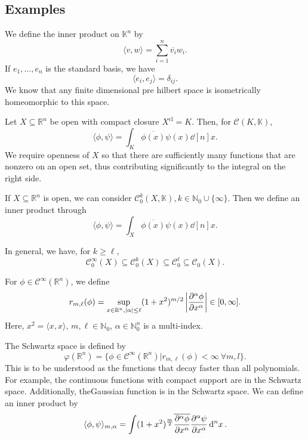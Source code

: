 \documentclass[prb,12pt]{revtex4-2}
\theoremstyle{definition}
\theoremstyle{definition}
\theoremstyle{definition}
\newcommand{\N}{\mathbb{N}}
\newcommand{\R}{\mathbb{R}}
\begin{document}
\subsection{Examples}
\begin{Example}
	We define the inner product on $\mathbb{K}^n$ by
	\[
		\langle v, w\rangle = \sum_{i=1}^n \overline{v_i}w_i
	.\] 
	If  $e_1, \dots, e_n$ is the standard basis, we have
	\[
		\langle e_i, e_j\rangle = \delta_{ij}
	.\]
	We know that any finite dimensional pre hilbert space is isometrically homeomorphic to this space.
\end{Example}
\begin{Example}
	Let $X\subseteq \R^n$ be open with compact closure $X^\text{cl}=K$. Then, for $\mathcal{C}(K, \mathbb{K})$, 
	\[
		\langle \phi, \psi\rangle = \int_K \overline{\phi(x)}\psi(x)\dd[n]{x}
	.\] 
	We require openness of $X$ so that there are sufficiently many functions that are nonzero on an open set, thus contributing significantly to the integral on the right side. 
\end{Example}
\begin{Example}
	If $X\subseteq \R^n$ is open, we can consider $\mathcal{C}_0^k(X, \mathbb{K}),k \in \N_0\cup \{\infty\} $. Then we define an inner product through
	\[
		\langle \phi, \psi\rangle = \int_X \overline{\phi(x)}\psi(x)\dd[n]{x}
	.\] 
\end{Example}
In general, we have, for $k\ge \ell$,
\[
	\mathcal{C}_0^\infty (X) \subseteq \mathcal{C}_0^k(X)\subseteq \mathcal{C}_0^{\ell}\subseteq \mathcal{C}_0(X)
.\] 
\begin{Example}
	For $\phi\in \mathcal{C}^\infty(\R^n)$, we define
	\[
		r_{m, \ell}(\phi) = \sup_{x\in \R^n,|\alpha|\le \ell}(1+x^2)^{m / 2} \left| \pdv[\alpha]{\phi}{x}(x) \right| \in [0,\infty]
	.\] 
	Here, $x^2 = \langle x,x \rangle$, $m, \ell \in \N_0$, $\alpha\in \N_0^n$ is a multi-index.

	The Schwartz space is defined by
	\[
		\varphi(\R^n) = \{\phi\in \mathcal{C}^\infty(\R^n)|r_{m,\ell}(\phi)<\infty~\forall m, l\} 
	.\] 
	This is to be understood as the functions that decay faster than all polynomials. For example, the continuous functions with compact support are in the Schwartz space. Additionally, theGaussian function is in the Schwartz space. We can define an inner product by
	\[
		\langle \phi, \psi\rangle_{m, \alpha} = \int (1+x^2)^{\frac{m}{2}}\overline{\pdv[\alpha]{\phi}{x}(x)}\pdv[\alpha]{\psi}{x}\dd[n]{x}
	.\] 
\end{Example}
\end{document}
